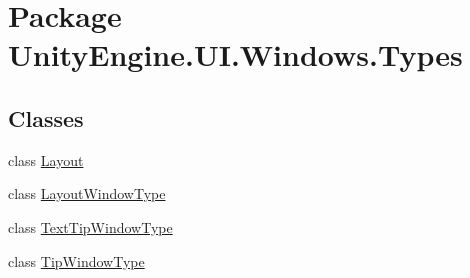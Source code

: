 \hypertarget{namespace_unity_engine_1_1_u_i_1_1_windows_1_1_types}{}\section{Package Unity\+Engine.\+U\+I.\+Windows.\+Types}
\label{namespace_unity_engine_1_1_u_i_1_1_windows_1_1_types}
\subsection*{Classes}
\begin{DoxyCompactItemize}
\item 
class \hyperlink{class_unity_engine_1_1_u_i_1_1_windows_1_1_types_1_1_layout}{Layout}
\item 
class \hyperlink{class_unity_engine_1_1_u_i_1_1_windows_1_1_types_1_1_layout_window_type}{Layout\+Window\+Type}
\item 
class \hyperlink{class_unity_engine_1_1_u_i_1_1_windows_1_1_types_1_1_text_tip_window_type}{Text\+Tip\+Window\+Type}
\item 
class \hyperlink{class_unity_engine_1_1_u_i_1_1_windows_1_1_types_1_1_tip_window_type}{Tip\+Window\+Type}
\end{DoxyCompactItemize}
